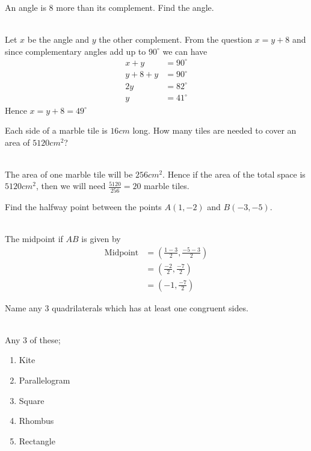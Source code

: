 \documentclass[addpoints,12pt]{exam}
\begin{document}
\begin{questions}
\begin{solution}
	  \end{solution}
	\else
	  \makeemptybox{1.33in}
	\fi
	
 \question An angle is 8 more than its complement. Find the angle.
	\ifprintanswers
	  \begin{solution}\\
		Let $x$ be the angle and $y$ the other complement. From the question $x=y+8$ and since 
complementary angles add up to $90^\circ$ we can have
		\begin{align}
		  x + y &= 90^\circ \\
		  y+8 +y &= 90^\circ \\
		  2y &= 82^\circ \\
		  y &= 41^\circ
		\end{align}
		Hence $x = y+8 = 49^\circ$
	  \end{solution}
	\else
	  \makeemptybox{1.33in}
	\fi

 \question Each side of a marble tile is $16cm$ long. How many tiles are needed to cover an 
area of $5120cm^2$?
	\ifprintanswers
	  \begin{solution}\\
		The area of one marble tile will be $256cm^2$. Hence if the area of the total space is 
$5120cm^2$, then we will need $\frac{5120}{256}=20$ marble tiles.
	  \end{solution}
	\else
	  \makeemptybox{1.33in}
	\fi

 \question Find the halfway point between the points $A(1,-2)$ and $B(-3, -5)$.
	\ifprintanswers
	  \begin{solution}\\
		 The midpoint if $AB$ is given by
		 \begin{align}
			\text{Midpoint} &= (\frac{1-3}{2}, \frac{-5-3}{2} ) \\
			  &= ( \frac{-2}{2}, \frac{-7}{2} ) \\
			  &= ( -1, \frac{-7}{2} )
		 \end{align}
	  \end{solution}
	\else
	  \makeemptybox{1.33in}
	\fi
	
	
 \question Name any 3 quadrilaterals which has at least one congruent sides.
	\ifprintanswers
	  \begin{solution}\\
		Any 3 of these;
		\begin{enumerate}
		 \item Kite
		 \item Parallelogram
		 \item Square
		 \item Rhombus
		 \item Rectangle
		\end{enumerate}
	  \end{solution}
	\else
	  \makeemptybox{1.33in}
	\fi
	

\end{questions}
\end{document}
